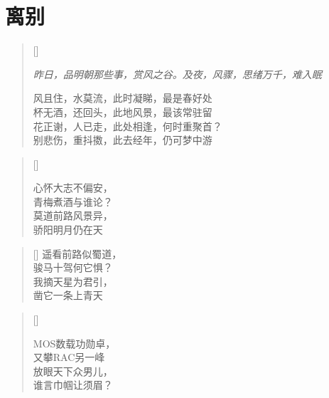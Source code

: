 \chapter{离别}
\thispagestyle{empty}
\renewcommand{\poemtoc}{section}
\settowidth{\versewidth}{风且住，水莫流，此时凝睇，最是春好处}
\begin{verse}[\versewidth]

\emph{\small{昨日，品明朝那些事，赏风之谷。及夜，风骤，思绪万千，难入眠}}

风且住，水莫流，此时凝睇，最是春好处\\
杯无酒，还回头，此地风景，最该常驻留\\
花正谢，人已走，此处相逢，何时重聚首？\\
别悲伤，重抖擞，此去经年，仍可梦中游\\
\end{verse}

\renewcommand{\poemtoc}{section}
\settowidth{\versewidth}{心怀大志不偏安}
\begin{verse}[\versewidth]

心怀大志不偏安，\\
青梅煮酒与谁论？\\
莫道前路风景异，\\
骄阳明月仍在天
\end{verse}

\renewcommand{\poemtoc}{section}
\settowidth{\versewidth}{心怀大志不偏安}
\begin{verse}[\versewidth]
遥看前路似蜀道，\\
骏马十驾何它惧？\\
我摘天星为君引，\\
凿它一条上青天
\end{verse}

\renewcommand{\poemtoc}{section}
\settowidth{\versewidth}{MOS数载功勋卓}
\begin{verse}[\versewidth]

MOS数载功勋卓，\\
又攀RAC另一峰\\
放眼天下众男儿，\\
谁言巾帼让须眉？
\end{verse}
